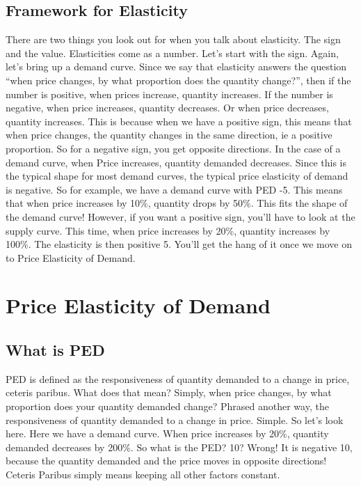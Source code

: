 \documentclass[DIV=classic,11pt,numbers=noenddot,listof=totoc,bibliography=totoc,parskip]{scrartcl}
\begin{document}
\subsection{Framework for Elasticity}
There are two things you look out for when you talk about elasticity. The sign and the value. Elasticities come as a number. Let’s start with the sign. Again, let’s bring up a demand curve. Since we say that elasticity answers the question “when price changes, by what proportion does the quantity change?”, then if the number is positive, when prices increase, quantity increases. If the number is negative, when price increases, quantity decreases. Or when price decreases, quantity increases. This is because when we have a positive sign, this means that when price changes, the quantity changes in the same direction, ie a positive proportion. So for a negative sign, you get opposite directions. In the case of a demand curve, when Price increases, quantity demanded decreases. Since this is the typical shape for most demand curves, the typical price elasticity of demand is negative. So for example, we have a demand curve with PED -5. This means that when price increases by 10\%, quantity drops by 50\%. This fits the shape of the demand curve! However, if you want a positive sign, you’ll have to look at the supply curve. This time, when price increases by 20\%, quantity increases by 100\%. The elasticity is then positive 5. You’ll get the hang of it once we move on to Price Elasticity of Demand.
\newpage
\section{Price Elasticity of Demand}
\subsection{What is PED}
PED is defined as the responsiveness of quantity demanded to a change in price, ceteris paribus. What does that mean? Simply, when price changes, by what proportion does your quantity demanded change? Phrased another way, the responsiveness of quantity demanded to a change in price. Simple. So let’s look here. Here we have a demand curve. When price increases by 20\%, quantity demanded decreases by 200\%. So what is the PED? 10? Wrong! It is negative 10, because the quantity demanded and the price moves in opposite directions! Ceteris Paribus simply means keeping all other factors constant. 
\end{document}
